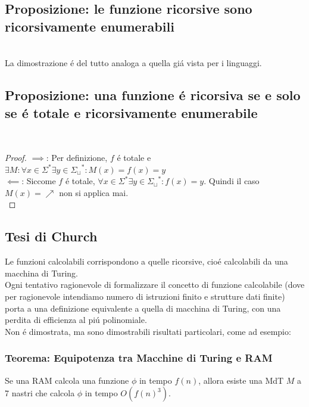 \subsection{Proposizione: le funzione ricorsive sono ricorsivamente enumerabili}
 \\
La dimostrazione é del tutto analoga a quella giá vista per i linguaggi.


\subsection{Proposizione: una funzione é ricorsiva se e solo se é totale e ricorsivamente enumerabile}
 \\

\begin{proof}
$\implies$: Per definizione, $f$ é totale e	$\exists M : \forall x \in \Sigma^* \exists y \in {\Sigma_\sqcup}^* : M(x) = f(x) = y$ \\
$\impliedby$:  Siccome $f$ é totale,  $ \forall x \in \Sigma^* \exists y \in {\Sigma_\sqcup}^* : f(x) = y$.
Quindi il caso $M(x) = \nearrow$ non si applica mai. \\
\end{proof}


\subsection{Tesi di Church}
Le funzioni calcolabili corrispondono a quelle ricorsive, cioé calcolabili da una macchina di Turing. \\
Ogni tentativo ragionevole di formalizzare il concetto di funzione calcolabile (dove per ragionevole intendiamo numero di istruzioni finito e strutture dati finite) porta a una definizione equivalente a quella di macchina di Turing, con una perdita di efficienza al piú polinomiale. \\

Non é dimostrata, ma sono dimostrabili risultati particolari, come ad esempio:
\subsubsection*{Teorema: Equipotenza tra Macchine di Turing e RAM}
Se una RAM calcola una funzione $\phi$ in tempo $f(n)$, allora esiste una MdT $M$ a 7 nastri che calcola $\phi$ in tempo $O(f(n)^3)$. \\